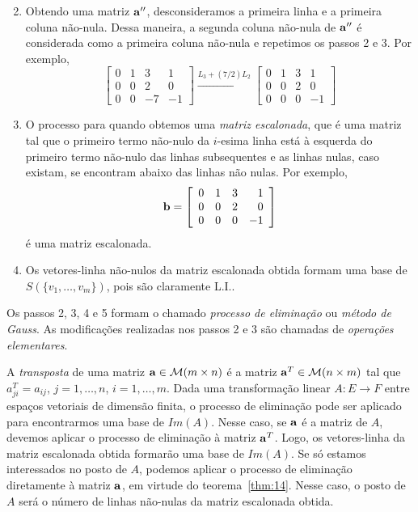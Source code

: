 \documentclass[12pt,a4paper]{article}
\newcommand{\dsqr}[1]{\left[#1\right]}
\theoremstyle{definition}
\begin{document}
\begin{enumerate}
$${  }$$
\item Obtendo uma matriz ${\bf a''}$, desconsideramos a primeira linha
  e a primeira coluna não-nula. Dessa maneira, a segunda coluna
  não-nula de ${\bf a}''$ é considerada como a primeira coluna
  não-nula e repetimos os passos 2 e 3. Por exemplo,
  $$\dsqr{
    \begin{array}{ccrr}
      0&1&3&1\\
      0&0&2&0\\
      0&0&-7&-1
    \end{array}
  }\xrightarrow{L_3+(7/2)L_2}\dsqr{
    \begin{array}{ccrr}
      0&1&3&1\\
      0&0&2&0\\
      0&0&0&-1
    \end{array}
  }$$
\item O processo para quando obtemos uma \textit{matriz escalonada},
  que é uma matriz tal que o primeiro termo não-nulo da $i$-esima
  linha está à esquerda do primeiro termo não-nulo das linhas
  subsequentes e as linhas nulas, caso existam, se encontram abaixo
  das linhas não nulas. Por exemplo,
  $${\bf b}=\dsqr{
    \begin{array}{ccrr}
      0&1&3&1\\
      0&0&2&0\\
      0&0&0&-1
    \end{array}
  }$$ é uma matriz escalonada.
\item Os vetores-linha não-nulos da matriz escalonada obtida formam
  uma base de $S(\{v_1,\ldots,v_m\})$, pois são claramente L.I..
\end{enumerate}
Os passos 2, 3, 4 e 5 formam o chamado \textit{processo de eliminação}
ou \textit{método de Gauss}. As modificações realizadas nos passos 2 e
3 são chamadas de \textit{operações elementares}.

A \textit{transposta} de uma matriz ${\bf a}\in{\cal M}(m\times n)$ é
a matriz ${\bf a}^T\in {\cal M}(n\times m)$ tal que $a^T_{ji}=a_{ij}$,
$j=1,\ldots,n$, $i=1,\ldots,m$. Dada uma transformação linear
$A:E\to F$ entre espaços vetoriais de dimensão finita, o processo de
eliminação pode ser aplicado para encontrarmos uma base de
$Im(A)$. Nesse caso, se ${\bf a}$ é a matriz de $A$, devemos aplicar o
processo de eliminação à matriz ${\bf a}^T$. Logo, os vetores-linha da
matriz escalonada obtida formarão uma base de $Im(A)$. Se só estamos
interessados no posto de $A$, podemos aplicar o processo de eliminação
diretamente à matriz ${\bf a}$, em virtude do
teorema~\ref{thm:14}. Nesse caso, o posto de $A$ será o número de
linhas não-nulas da matriz escalonada obtida.
\end{document}
